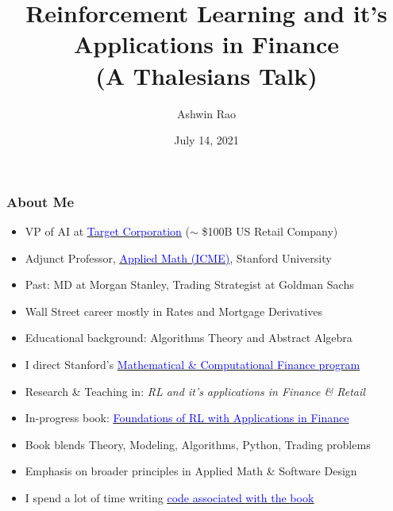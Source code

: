 \documentclass[handout]{beamer}
\title[RL for Finance]{Reinforcement Learning and it's Applications in Finance\\ (A Thalesians Talk)} %
\author{Ashwin Rao} %
\institute[Stanford] %
{Stanford University
}
\date{July 14, 2021} %
\begin{document}
\begin{frame}
\titlepage %
\end{frame}


\begin{frame}
\frametitle{About Me}
\pause
\begin{itemize}[<+->]
\item VP of AI at \href{https://www.target.com/}{\underline{\textcolor{blue}{Target Corporation}}} ($\sim$ \$100B US Retail Company)
\item Adjunct Professor, \href{https://icme.stanford.edu/}{\underline{\textcolor{blue}{Applied Math (ICME)}}}, Stanford University
\item Past: MD at Morgan Stanley, Trading Strategist at Goldman Sachs
\item Wall Street career mostly in Rates and Mortgage Derivatives
\item Educational background: Algorithms Theory and Abstract Algebra
\item I direct Stanford's \href{https://mcf.stanford.edu/}{\underline{\textcolor{blue}{Mathematical \& Computational Finance program}}}
\item Research \& Teaching in: {\em RL and it's applications in Finance \& Retail}
\item In-progress book:  \href{http://stanford.edu/~ashlearn/RLForFinanceBook/book.pdf}{\underline{\textcolor{blue}{Foundations of RL with Applications in Finance}}}
\item Book blends Theory, Modeling, Algorithms, Python, Trading problems
\item Emphasis on broader principles in Applied Math \& Software Design
\item I spend a lot of time writing  \href{https://github.com/TikhonJelvis/RL-book}{\underline{\textcolor{blue}{code associated with the book}}}
\end{itemize}
\end{frame}
\end{document}
